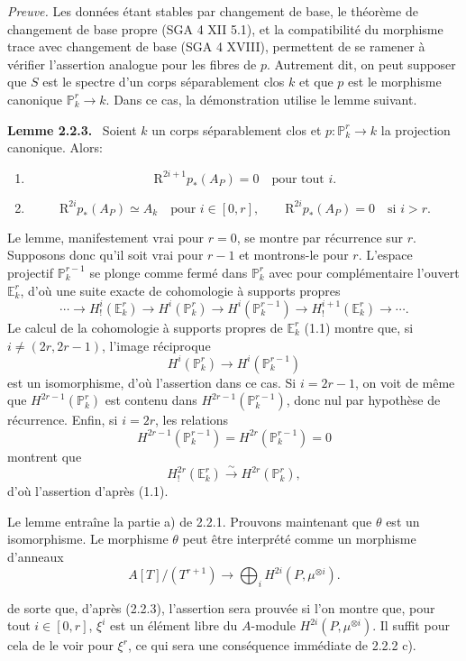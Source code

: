 \documentclass[11pt]{article}
\newenvironment{statement}[1]{\par\medskip\noindent\textbf{#1.}\ }{\par\medskip}
\newcommand{\R}{\mathrm{R}}\newcommand{\RHomCore}{\mathrm{RHom}}
\providecommand{\R}{\mathrm R}
\begin{document}
\emph{Preuve.} Les données étant stables par changement de base, le théorème de changement de base propre (SGA 4 XII 5.1), et la compatibilité du morphisme trace avec changement de base (SGA 4 XVIII), permettent de se ramener à vérifier l'assertion analogue pour les fibres de $p$. Autrement dit, on peut supposer que $S$ est le spectre d'un corps séparablement clos $k$ et que $p$ est le morphisme canonique $\mathbb P^r_k\to k$. Dans ce cas, la démonstration utilise le lemme suivant.

\begin{statement}{Lemme 2.2.3}
Soient $k$ un corps séparablement clos et $p:\mathbb P_k^r\to k$ la projection canonique. Alors:
\begin{enumerate}[label=\alph*)]
\item
\[
\R^{2i+1}p_*(A_P)=0\quad\text{pour tout }i.
\]
\item
\[
\R^{2i}p_*(A_P)\simeq A_k\quad\text{pour }i\in[0,r],
\qquad
\R^{2i}p_*(A_P)=0\quad\text{si }i>r.
\]
\end{enumerate}
\end{statement}

Le lemme, manifestement vrai pour $r=0$, se montre par récurrence sur $r$. Supposons donc qu'il soit vrai pour $r-1$ et montrons-le pour $r$. L'espace projectif $\mathbb P_k^{r-1}$ se plonge comme fermé dans $\mathbb P_k^r$ avec pour complémentaire l'ouvert $\mathbb E_k^r$, d'où une suite exacte de cohomologie à supports propres
\[
\cdots\longrightarrow H_!^i(\mathbb E_k^r)\longrightarrow H^i(\mathbb P_k^r)
\longrightarrow H^i(\mathbb P_k^{r-1})\longrightarrow H_!^{i+1}(\mathbb E_k^r)\longrightarrow\cdots.
\]
Le calcul de la cohomologie à supports propres de $\mathbb E_k^r$ (1.1) montre que, si $i\ne(2r,2r-1)$, l'image réciproque
\[
H^i(\mathbb P_k^r)\longrightarrow H^i(\mathbb P_k^{r-1})
\]
est un isomorphisme, d'où l'assertion dans ce cas. Si $i=2r-1$, on voit de même que $H^{2r-1}(\mathbb P_k^r)$ est contenu dans $H^{2r-1}(\mathbb P_k^{r-1})$, donc nul par hypothèse de récurrence. Enfin, si $i=2r$, les relations
\[
H^{2r-1}(\mathbb P_k^{r-1})=H^{2r}(\mathbb P_k^{r-1})=0
\]
montrent que
\[
H_!^{2r}(\mathbb E_k^r)\xrightarrow{\sim}H^{2r}(\mathbb P_k^r),
\]
d'où l'assertion d'après (1.1).

Le lemme entraîne la partie a) de 2.2.1. Prouvons maintenant que $\theta$ est un isomorphisme. Le morphisme $\theta$ peut être interprété comme un morphisme d'anneaux
\[
A[T]/(T^{r+1})\longrightarrow\bigoplus_i H^{2i}(P,\mu^{\otimes i}).
\]


de sorte que, d'après (2.2.3), l'assertion sera prouvée si l'on montre que, pour tout $i\in[0,r]$, $\xi^i$ est un élément libre du $A$-module $H^{2i}(P,\mu^{\otimes i})$. Il suffit pour cela de le voir pour $\xi^r$, ce qui sera une conséquence immédiate de 2.2.2 c).
\end{document}
